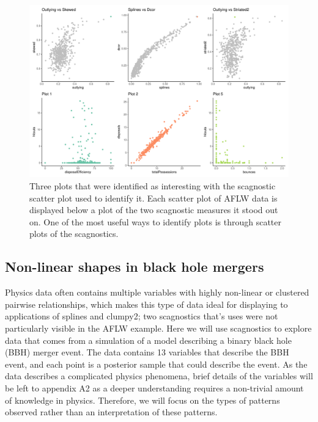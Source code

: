 \begin{Schunk}
\begin{figure}

{\centering \includegraphics[width=1\linewidth]{mason-lee-laa-cook_files/figure-latex/threeplot-static-1} 

}

\caption[Three plots that were identified as interesting with the scagnostic scatter plot used to identify it]{Three plots that were identified as interesting with the scagnostic scatter plot used to identify it. Each scatter plot of AFLW data is displayed below a plot of the two scagnostic measures it stood out on. One of the most useful ways to identify plots is through scatter plots of the scagnostics.}\label{fig:threeplot-static}
\end{figure}
\end{Schunk}

\hypertarget{non-linear-shapes-in-black-hole-mergers}{%
\subsection{Non-linear shapes in black hole
mergers}\label{non-linear-shapes-in-black-hole-mergers}}

Physics data often contains multiple variables with highly non-linear or
clustered pairwise relationships, which makes this type of data ideal
for displaying to applications of splines and clumpy2; two scagnostics
that's uses were not particularly visible in the AFLW example. Here we
will use scagnostics to explore data that comes from a simulation of a
model describing a binary black hole (BBH) merger event. The data
contains 13 variables that describe the BBH event, and each point is a
posterior sample that could describe the event. As the data describes a
complicated physics phenomena, brief details of the variables will be
left to appendix A2 as a deeper understanding requires a non-trivial
amount of knowledge in physics. Therefore, we will focus on the types of
patterns observed rather than an interpretation of these patterns.

